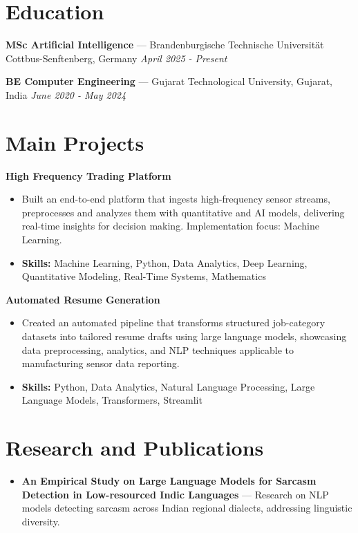 \documentclass[a4paper,10pt]{article}
\begin{document}
\section*{Education}
\textbf{MSc Artificial Intelligence} — Brandenburgische Technische Universität Cottbus-Senftenberg, Germany \hfill \textit{April 2025 - Present}\par
\vspace{1.5pt}
\textbf{BE Computer Engineering} — Gujarat Technological University, Gujarat, India \hfill \textit{June 2020 - May 2024}\par

\section*{Main Projects}
\textbf{High Frequency Trading Platform}\par
\vspace{1pt}
\begin{itemize}
  \item Built an end-to-end platform that ingests high-frequency sensor streams, preprocesses and analyzes them with quantitative and AI models, delivering real-time insights for decision making. Implementation focus: Machine Learning.
  \item \textbf{Skills:} Machine Learning, Python, Data Analytics, Deep Learning, Quantitative Modeling, Real-Time Systems, Mathematics
\end{itemize}
\vspace{3pt}
\textbf{Automated Resume Generation}\par
\vspace{1pt}
\begin{itemize}
  \item Created an automated pipeline that transforms structured job-category datasets into tailored resume drafts using large language models, showcasing data preprocessing, analytics, and NLP techniques applicable to manufacturing sensor data reporting.
  \item \textbf{Skills:} Python, Data Analytics, Natural Language Processing, Large Language Models, Transformers, Streamlit
\end{itemize}

\section*{Research and Publications}
\begin{itemize}
\item \textbf{An Empirical Study on Large Language Models for Sarcasm Detection in Low-resourced Indic Languages} — Research on NLP models detecting sarcasm across Indian regional dialects, addressing linguistic diversity.
\end{itemize}
\end{document}
